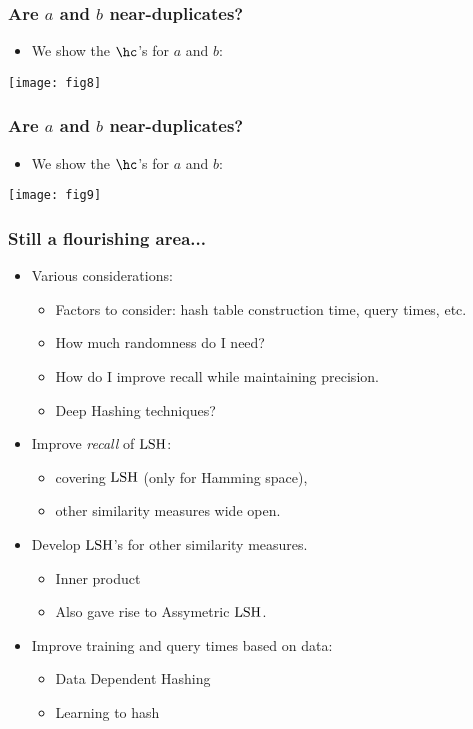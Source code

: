 \documentclass{beamer}
\begin{document}
\begin{frame}
\frametitle{Are $a$ and $b$ near-duplicates?}
\begin{itemize}
\item We show the $\hc$'s for $a$ and $b$:
\end{itemize}
\begin{center}
\texttt{[image: fig8]}
\end{center}
\end{frame}

\begin{frame}
\frametitle{Are $a$ and $b$ near-duplicates?}
\begin{itemize}
\item We show the $\hc$'s for $a$ and $b$:
\end{itemize}
\begin{center}
\texttt{[image: fig9]}
\end{center}
\end{frame}


\begin{frame}
\frametitle{Still a flourishing area...}
\begin{itemize}
\item Various considerations:
\begin{itemize}
\item Factors to consider: hash table construction time, query times, etc. 
\item How much randomness do I need?
\item How do I improve recall while maintaining precision.
\item Deep Hashing techniques?
\end{itemize}
\item Improve \textit{recall} of $\mathrm{LSH}$: 
\begin{itemize}
\item covering $\mathrm{LSH}$ (only for Hamming space),
\item other similarity measures wide open.
\end{itemize} 
\item Develop $\mathrm{LSH}$'s for other similarity measures.
\begin{itemize}
\item Inner product 
\item Also gave rise to Assymetric $\mathrm{LSH}$.
\end{itemize}
\item Improve training and query times based on data:
\begin{itemize}
\item Data Dependent Hashing
\item Learning to hash
\end{itemize}
\end{itemize}
\end{frame}
\end{document}
